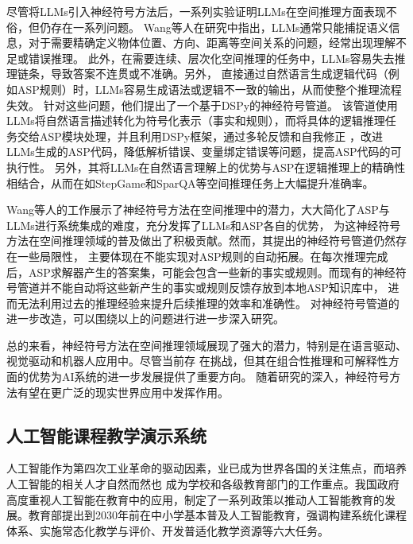 尽管将LLMs引入神经符号方法后，一系列实验证明LLMs在空间推理方面表现不俗，但仍存在一系列问题。
Wang等人\cite{wang2024DSPy}在研究中指出，LLMs通常只能捕捉语义信息，对于需要精确定义物体位置、方向、距离等空间关系的问题，经常出现理解不足或错误推理。
此外，在需要连续、层次化空间推理的任务中，LLMs容易失去推理链条，导致答案不连贯或不准确。另外，
直接通过自然语言生成逻辑代码（例如ASP规则）时，LLMs容易生成语法或逻辑不一致的输出，从而使整个推理流程失效。
针对这些问题，他们提出了一个基于DSPy的神经符号管道。
该管道使用LLMs将自然语言描述转化为符号化表示（事实和规则），而将具体的逻辑推理任务交给ASP模块处理，并且利用DSPy框架，通过多轮反馈和自我修正
，改进LLMs生成的ASP代码，降低解析错误、变量绑定错误等问题，提高ASP代码的可执行性。
另外，其将LLMs在自然语言理解上的优势与ASP在逻辑推理上的精确性相结合，从而在如StepGame和SparQA等空间推理任务上大幅提升准确率。

Wang等人\cite{wang2024DSPy}的工作展示了神经符号方法在空间推理中的潜力，大大简化了ASP与LLMs进行系统集成的难度，充分发挥了LLMs和ASP各自的优势，
为这神经符号方法在空间推理领域的普及做出了积极贡献。然而，其提出的神经符号管道仍然存在一些局限性，
主要体现在不能实现对ASP规则的自动拓展。在每次推理完成后，ASP求解器产生的答案集，可能会包含一些新的事实或规则。而现有的神经符号管道并不能自动将这些新产生的事实或规则反馈存放到本地ASP知识库中，
进而无法利用过去的推理经验来提升后续推理的效率和准确性。
对神经符号管道的进一步改造，可以围绕以上的问题进行进一步深入研究。

总的来看，神经符号方法在空间推理领域展现了强大的潜力，特别是在语言驱动、视觉驱动和机器人应用中。尽管当前存
在挑战，但其在组合性推理和可解释性方面的优势为AI系统的进一步发展提供了重要方向。
随着研究的深入，神经符号方法有望在更广泛的现实世界应用中发挥作用。
\subsection{人工智能课程教学演示系统}
人工智能作为第四次工业革命的驱动因素，业已成为世界各国的关注焦点，而培养人工智能的相关人才自然而然也
成为学校和各级教育部门的工作重点。我国政府高度重视人工智能在教育中的应用，制定了一系列政策以推动人工智能教育的发展。
​教育部提出到2030年前在中小学基本普及人工智能教育，强调构建系统化课程体系、实施常态化教学与评价、开发普适化教学资源等六大任务。\cite{moe_ai_2024}

